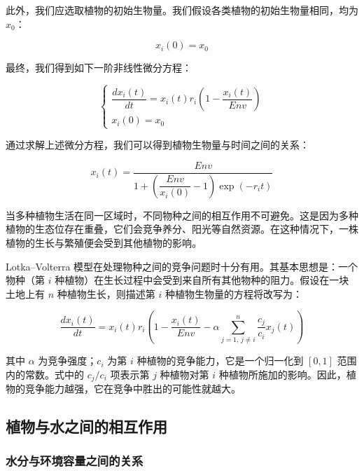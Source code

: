 \documentclass[11pt,a4paper]{ctexart}
\begin{document}
此外，我们应选取植物的初始生物量。我们假设各类植物的初始生物量相同，均为 $x_0$：

\begin{equation}
x_i(0)=x_0
\label{eq:init}
\end{equation}

最终，我们得到如下一阶非线性微分方程：

\begin{equation}
\begin{cases}
\dfrac{dx_i(t)}{dt}=x_i(t)r_i\left(1-\dfrac{x_i(t)}{Env}\right)\\[1.2em]
x_i(0)=x_0
\end{cases}
\label{eq:single}
\end{equation}

通过求解上述微分方程，我们可以得到植物生物量与时间之间的关系：

\begin{equation}
x_i(t)=\frac{Env}{1+\left(\dfrac{Env}{x_i(0)}-1\right)\exp(-r_it)}
\label{eq:solution}
\end{equation}

当多种植物生活在同一区域时，不同物种之间的相互作用不可避免。这是因为多种植物的生态位存在重叠，它们会竞争养分、阳光等自然资源。在这种情况下，一株植物的生长与繁殖便会受到其他植物的影响。

Lotka--Volterra 模型在处理物种之间的竞争问题时十分有用。其基本思想是：一个物种（第 $i$ 种植物）在生长过程中会受到来自所有其他物种的阻力。假设在一块土地上有 $n$ 种植物生长，则描述第 $i$ 种植物生物量的方程将改写为：

\begin{equation}
\frac{dx_i(t)}{dt}=x_i(t)r_i\left(1-\frac{x_i(t)}{Env}-\alpha\sum_{j=1,\,j\neq i}^{n}\frac{c_j}{c_i}x_j(t)\right)
\label{eq:lv}
\end{equation}

其中 $\alpha$ 为竞争强度；$c_i$ 为第 $i$ 种植物的竞争能力，它是一个归一化到 $[0,1]$ 范围内的常数。式中的 $c_j/c_i$ 项表示第 $j$ 种植物对第 $i$ 种植物所施加的影响。因此，植物的竞争能力越强，它在竞争中胜出的可能性就越大。

\subsection{植物与水之间的相互作用}

\subsubsection{水分与环境容量之间的关系}
\end{document}

